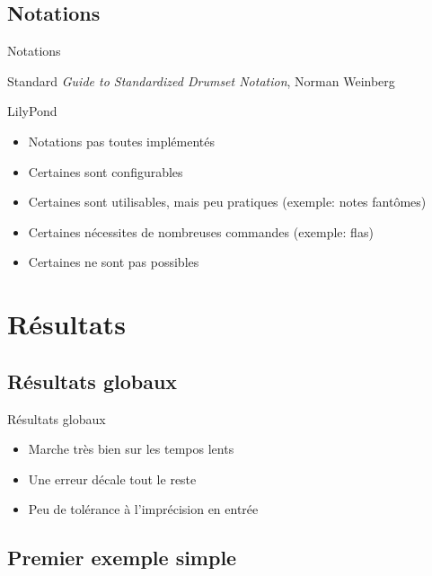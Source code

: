 \documentclass{beamer}
\begin{document}
\subsection{Notations}

\begin{frame}{Notations}
    \begin{block}{Standard}
        \emph{Guide to Standardized Drumset Notation}, Norman Weinberg
    \end{block}
    \begin{block}{LilyPond}
        \begin{itemize}
            \item Notations pas toutes implémentés
            \item Certaines sont configurables
            \item Certaines sont utilisables, mais peu pratiques (exemple:
                notes fantômes)
            \item Certaines nécessites de nombreuses commandes (exemple: flas)
            \item Certaines ne sont pas possibles
        \end{itemize}
    \end{block}
\end{frame}

\section{Résultats}

\subsection{Résultats globaux}

\begin{frame}{Résultats globaux}
    \begin{itemize}
        \item Marche très bien sur les tempos lents
        \item Une erreur décale tout le reste
        \item Peu de tolérance à l’imprécision en entrée
    \end{itemize}
\end{frame}

\subsection{Premier exemple simple}
\end{document}
